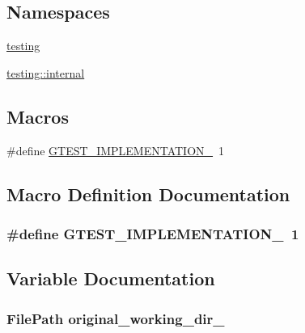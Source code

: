 \subsection*{Namespaces}
\begin{DoxyCompactItemize}
\item 
 \hyperlink{namespacetesting}{testing}
\item 
 \hyperlink{namespacetesting_1_1internal}{testing\+::internal}
\end{DoxyCompactItemize}
\subsection*{Macros}
\begin{DoxyCompactItemize}
\item 
\#define \hyperlink{gtest-options__test_8cc_a83bd232fd1077579fada92c31bb7469f}{G\+T\+E\+S\+T\+\_\+\+I\+M\+P\+L\+E\+M\+E\+N\+T\+A\+T\+I\+O\+N\+\_\+}~1
\end{DoxyCompactItemize}


\subsection{Macro Definition Documentation}
\subsubsection[{\texorpdfstring{G\+T\+E\+S\+T\+\_\+\+I\+M\+P\+L\+E\+M\+E\+N\+T\+A\+T\+I\+O\+N\+\_\+}{GTEST_IMPLEMENTATION_}}]{\setlength{\rightskip}{0pt plus 5cm}\#define G\+T\+E\+S\+T\+\_\+\+I\+M\+P\+L\+E\+M\+E\+N\+T\+A\+T\+I\+O\+N\+\_\+~1}\hypertarget{gtest-options__test_8cc_a83bd232fd1077579fada92c31bb7469f}{}\label{gtest-options__test_8cc_a83bd232fd1077579fada92c31bb7469f}


\subsection{Variable Documentation}
\subsubsection[{\texorpdfstring{original\+\_\+working\+\_\+dir\+\_\+}{original_working_dir_}}]{\setlength{\rightskip}{0pt plus 5cm}File\+Path original\+\_\+working\+\_\+dir\+\_\+\hspace{0.3cm}{\ttfamily [protected]}}\hypertarget{gtest-options__test_8cc_aa5f13fd18a275d0a3117700f30bfb9ff}{}\label{gtest-options__test_8cc_aa5f13fd18a275d0a3117700f30bfb9ff}
